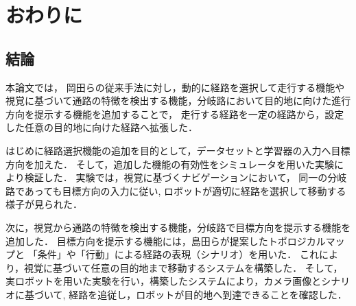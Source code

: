 \chapter{おわりに}
\label{chap:end}
\section{結論}
本論文では，
岡田らの従来手法に対し，動的に経路を選択して走行する機能や
視覚に基づいて通路の特徴を検出する機能，分岐路において目的地に向けた進行方向を提示する機能を追加することで，
走行する経路を一定の経路から，設定した任意の目的地に向けた経路へ拡張した．

はじめに経路選択機能の追加を目的として，データセットと学習器の入力へ目標方向を加えた．
そして，追加した機能の有効性をシミュレータを用いた実験により検証した．
実験では，視覚に基づくナビゲーションにおいて，
同一の分岐路であっても目標方向の入力に従い, 
ロボットが適切に経路を選択して移動する様子が見られた．

次に，視覚から通路の特徴を検出する機能，分岐路で目標方向を提示する機能を追加した．
目標方向を提示する機能には，島田らが提案したトポロジカルマップと
「条件」や「行動」による経路の表現（シナリオ）を用いた．
これにより，視覚に基づいて任意の目的地まで移動するシステムを構築した．
そして，実ロボットを用いた実験を行い，構築したシステムにより，カメラ画像とシナリオに基づいて, 
経路を追従し，ロボットが目的地へ到達できることを確認した．

